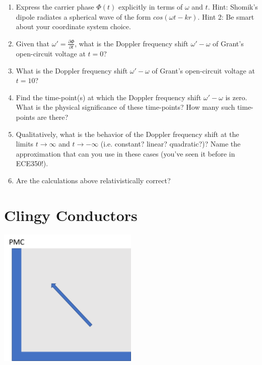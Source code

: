 \documentclass{article}
\begin{document}
\begin{enumerate}[label=(\alph*)]
    \item Express the carrier phase $\Phi(t)$ explicitly in terms of $\omega$ and $t$. Hint: Shomik's dipole radiates a spherical wave of the form $cos(\omega t - kr)$. Hint 2: Be smart about your coordinate system choice.

    \item Given that $\omega' = \frac{\partial \Phi}{\partial t}$, what is the Doppler frequency shift $\omega' - \omega$ of Grant's open-circuit voltage at $t = 0$?

    \item What is the Doppler frequency shift $\omega' - \omega$ of Grant's open-circuit voltage at $t = 10$?

    \item Find the time-point(s) at which the Doppler frequency shift $\omega' - \omega$ is zero. What is the physical significance of these time-points? How many such time-points are there?

    \item Qualitatively, what is the behavior of the Doppler frequency shift at the limits $t \longrightarrow \infty$ and $t \longrightarrow -\infty$ (i.e. constant? linear? quadratic?)? Name the approximation that can you use in these cases (you've seen it before in ECE350!).

    \item Are the calculations above relativistically correct?

\end{enumerate}

\newpage

\section{Clingy Conductors}

\begin{center}
\includegraphics[width=0.5\textwidth]{figures/PMC Prompt.jpg}
\end{center}
\end{document}

